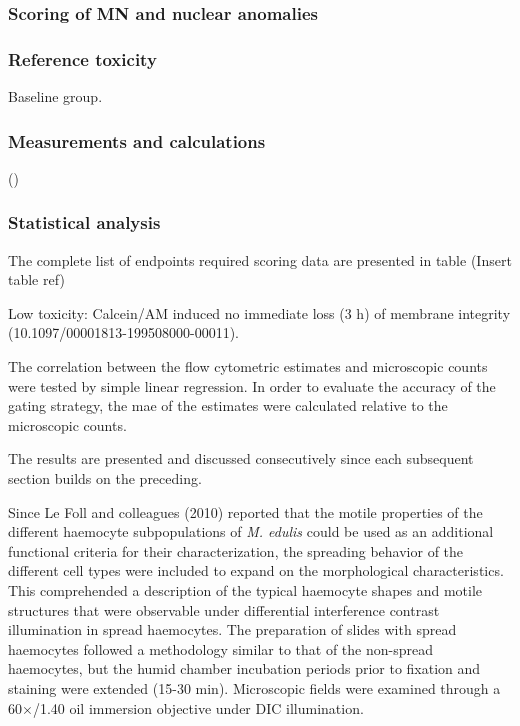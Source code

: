 \subsubsection{Scoring of MN and nuclear anomalies}

\subsubsection{Reference toxicity}
Baseline group.

\subsubsection{Measurements and calculations}
(\cite{R-project})

\subsubsection{Statistical analysis}


The complete list of endpoints required scoring data are presented in table (Insert table ref)

Low toxicity: Calcein/AM induced no immediate loss (3 h) of membrane integrity (10.1097/00001813-199508000-00011).


The correlation between the flow cytometric estimates and microscopic counts were tested by simple linear regression. In order to evaluate the accuracy of the gating strategy, the \acrshort{mae} of the estimates were calculated relative to the microscopic counts.

The results are presented and discussed consecutively since each subsequent section builds on the preceding.

Since Le Foll and colleagues (2010) reported that the motile properties of the different haemocyte subpopulations of \emph{M. edulis} could be used as an additional functional criteria for their characterization, the spreading behavior of the different cell types were included to expand on the morphological characteristics. This comprehended a description of the typical haemocyte shapes and motile structures that were observable under differential interference contrast illumination in spread haemocytes. The preparation of slides with spread haemocytes followed a methodology similar to that of the non-spread haemocytes, but the humid chamber incubation periods prior to fixation and staining were extended (15-30 min). Microscopic fields were examined through a 60$\times$/1.40 oil immersion objective under DIC illumination.

